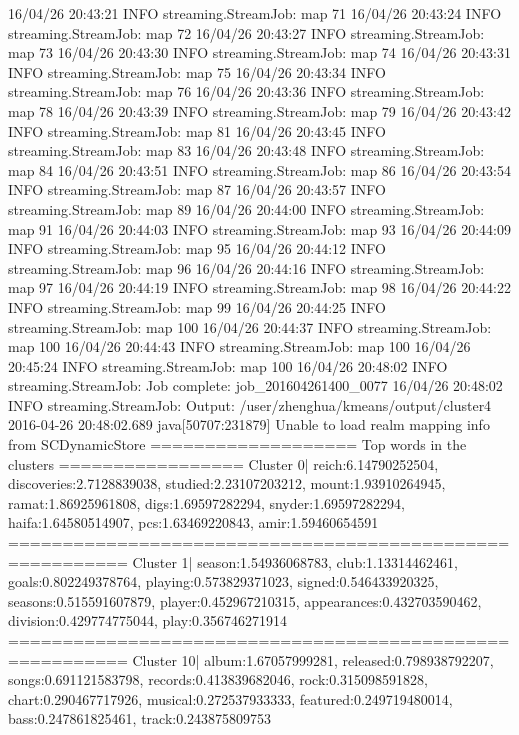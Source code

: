 16/04/26 20:43:21 INFO streaming.StreamJob:  map 71%
16/04/26 20:43:24 INFO streaming.StreamJob:  map 72%
16/04/26 20:43:27 INFO streaming.StreamJob:  map 73%
16/04/26 20:43:30 INFO streaming.StreamJob:  map 74%
16/04/26 20:43:31 INFO streaming.StreamJob:  map 75%
16/04/26 20:43:34 INFO streaming.StreamJob:  map 76%
16/04/26 20:43:36 INFO streaming.StreamJob:  map 78%
16/04/26 20:43:39 INFO streaming.StreamJob:  map 79%
16/04/26 20:43:42 INFO streaming.StreamJob:  map 81%
16/04/26 20:43:45 INFO streaming.StreamJob:  map 83%
16/04/26 20:43:48 INFO streaming.StreamJob:  map 84%
16/04/26 20:43:51 INFO streaming.StreamJob:  map 86%
16/04/26 20:43:54 INFO streaming.StreamJob:  map 87%
16/04/26 20:43:57 INFO streaming.StreamJob:  map 89%
16/04/26 20:44:00 INFO streaming.StreamJob:  map 91%
16/04/26 20:44:03 INFO streaming.StreamJob:  map 93%
16/04/26 20:44:09 INFO streaming.StreamJob:  map 95%
16/04/26 20:44:12 INFO streaming.StreamJob:  map 96%
16/04/26 20:44:16 INFO streaming.StreamJob:  map 97%
16/04/26 20:44:19 INFO streaming.StreamJob:  map 98%
16/04/26 20:44:22 INFO streaming.StreamJob:  map 99%
16/04/26 20:44:25 INFO streaming.StreamJob:  map 100%
16/04/26 20:44:37 INFO streaming.StreamJob:  map 100%
16/04/26 20:44:43 INFO streaming.StreamJob:  map 100%
16/04/26 20:45:24 INFO streaming.StreamJob:  map 100%
16/04/26 20:48:02 INFO streaming.StreamJob: Job complete: job_201604261400_0077
16/04/26 20:48:02 INFO streaming.StreamJob: Output: /user/zhenghua/kmeans/output/cluster4
2016-04-26 20:48:02.689 java[50707:231879] Unable to load realm mapping info from SCDynamicStore
=================== Top words in the clusters ================= 
Cluster 0| reich:6.14790252504, discoveries:2.7128839038, studied:2.23107203212, mount:1.93910264945, ramat:1.86925961808, digs:1.69597282294, snyder:1.69597282294, haifa:1.64580514907, pcs:1.63469220843, amir:1.59460654591
========================================================= 
Cluster 1| season:1.54936068783, club:1.13314462461, goals:0.802249378764, playing:0.573829371023, signed:0.546433920325, seasons:0.515591607879, player:0.452967210315, appearances:0.432703590462, division:0.429774775044, play:0.356746271914
========================================================= 
Cluster 10| album:1.67057999281, released:0.798938792207, songs:0.691121583798, records:0.413839682046, rock:0.315098591828, chart:0.290467717926, musical:0.272537933333, featured:0.249719480014, bass:0.247861825461, track:0.243875809753
